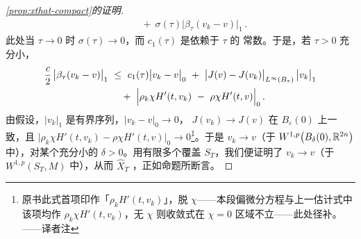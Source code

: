 \begin{proof}[\cref*{prop:xthat-compact}的证明]
\[\begin{aligned}
&\qquad+\ \sigma(\tau)\bigl|\beta_{\tau}(v_{k}-v)\bigr|_{1}\,.
\end{aligned}
\]
此处当 $\tau\to0$ 时 $\sigma(\tau)\to0$，而 $c_{1}(\tau)$ 是依赖于 $\tau$ 的%
常数。于是，若 $\tau>0$ 充分小，
\begin{align*}
\frac{c}{2}\,\bigl|\beta_{\tau}(v_{k}-v)\bigr|_{1}\ &\leq\ c_{1}(\tau)\bigl|v_{k}-v\bigr|_{0}\ +\ \bigl|J(v)-J(v_{k})\bigr|_{L^{\infty}(B_{\tau})}\,\bigl|v_{k}\bigr|_{1}\\
&\quad+\ \Bigl|\rho_{k}\chi H'(t,v_{k})\ -\ \rho\chi H'(t,v)\Bigr|_{0}\,.
\end{align*}
由假设，$\bigl|v_{k}\bigr|_{1}$ 是有界序列，$\bigl|v_{k}-v\bigr|_{0}\to0$，%
$J(v_{k})\to J(v)$ 在 $B_{\varepsilon}(0)$ 上一致，且%
$\bigl|\rho_{k}\chi H'(t,v_{k})-\rho\chi H'(t,v)\bigr|_{0}\to0$\footnote{原书此式首项印作「$\rho_{k}H'(t,v_{k})$」，脱 $\chi$——本段偏微分方程与上一估计式中该项均作 $\rho_{k}\chi H'(t,v_{k})$，无 $\chi$ 则收敛式在 $\chi=0$ 区域不立——此处径补。——译者注}。于是%
$v_{k}\to v$（于 $W^{1,p}\bigl(B_{\delta}(0),\mathbb{R}^{2n}\bigr)$ 中），对某个充分小的%
$\delta>0$。用有限多个\trChart{}覆盖 $S_{T}$，我们便证明了 $v_{k}\to v$（于%
$W^{1,p}(S_{T},M)$ 中），从而 $\hat{X}_{T}$ \trCompact，正如命题所断言。


\end{proof}
